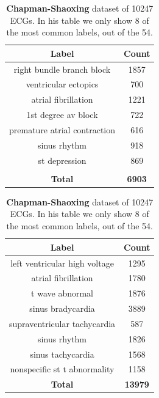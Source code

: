 \documentclass{article}
\begin{document}
\begin{table}
\centering
\begin{minipage}{.47\linewidth}
\centering
\begin{tabular}{|c|c|}
 \hline
Label & Count \\
 \hline
right bundle branch block    &  1857 \\
ventricular ectopics         &   700 \\
atrial fibrillation          &  1221 \\
1st degree av block          &   722 \\
premature atrial contraction &   616 \\
sinus rhythm                 &   918 \\
st depression                &   869 \\
                            &     \\
 \hline
\textbf{Total} & \textbf{6903}\\
\hline
\end{tabular}
\caption {\textbf{CPSC2018} dataset of 6877 ECGs.}
\label{tab:CPSC}
\end{minipage}
\hfill
\hspace{0.2 in}
\begin{minipage}{.47\linewidth}
\centering
\begin{tabular}{|c|c|}
 \hline
Label & Count \\
 \hline
left ventricular high voltage &  1295 \\
atrial fibrillation           &  1780 \\
t wave abnormal               &  1876 \\
sinus bradycardia             &  3889 \\
supraventricular tachycardia  &   587 \\
sinus rhythm                  &  1826 \\
sinus tachycardia             &  1568 \\
nonspecific st t abnormality  &  1158 \\
 \hline
\textbf{Total} & \textbf{13979}\\
\hline


\end{tabular}

\caption {\textbf{Chapman-Shaoxing} dataset of 10247 ECGs. In his table we only show 8 of the most common labels, out of the 54. }
\label{tab:ChapmanShaoxing}
\end{minipage}

\end{table}
\end{document}
